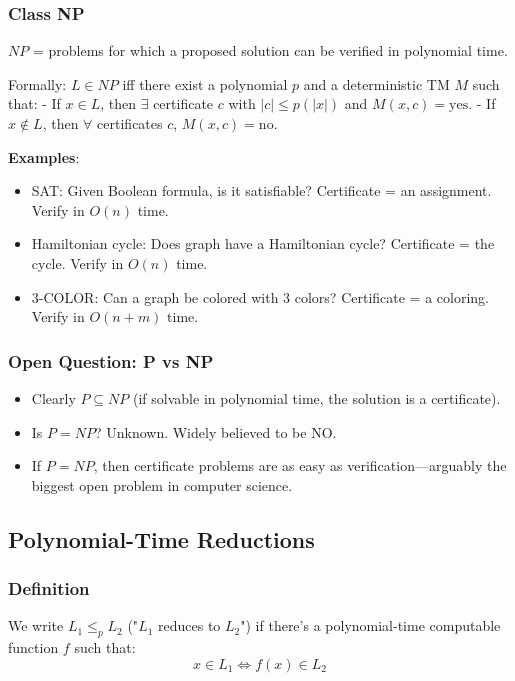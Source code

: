 \documentclass[11pt]{article}
\begin{document}
{{{\subsubsection*{Class NP}
$NP$ = problems for which a proposed solution can be verified in polynomial time.

Formally: $L \in NP$ iff there exist a polynomial $p$ and a deterministic TM $M$ such that:
- If $x \in L$, then $\exists$ certificate $c$ with $|c| \le p(|x|)$ and $M(x, c) = \text{yes}$.
- If $x \notin L$, then $\forall$ certificates $c$, $M(x, c) = \text{no}$.

\textbf{Examples}:
\begin{itemize}
\item SAT: Given Boolean formula, is it satisfiable? Certificate = an assignment. Verify in $O(n)$ time.
\item Hamiltonian cycle: Does graph have a Hamiltonian cycle? Certificate = the cycle. Verify in $O(n)$ time.
\item 3-COLOR: Can a graph be colored with 3 colors? Certificate = a coloring. Verify in $O(n + m)$ time.
\end{itemize}

\subsubsection*{Open Question: P vs NP}
\begin{itemize}
\item Clearly $P \subseteq NP$ (if solvable in polynomial time, the solution is a certificate).
\item Is $P = NP$? Unknown. Widely believed to be NO.
\item If $P = NP$, then certificate problems are as easy as verification—arguably the biggest open problem in computer science.
\end{itemize}

\subsection*{Polynomial-Time Reductions}

\subsubsection*{Definition}
We write $L_1 \le_p L_2$ ("$L_1$ reduces to $L_2$") if there's a polynomial-time computable function $f$ such that:
\[
x \in L_1 \Leftrightarrow f(x) \in L_2
\]

}}}
\end{document}
